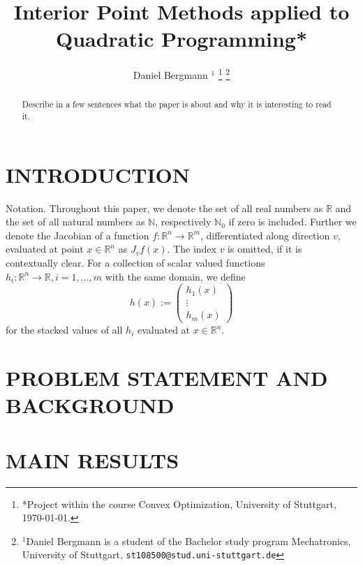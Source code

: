 \documentclass[a4paper, 10pt, conference]{ieeeconf}      %
\title{\LARGE \bf Interior Point Methods applied to Quadratic Programming*}
\author{Daniel Bergmann $^{1}$%
\thanks{*Project within the course Convex Optimization, University of Stuttgart, \today.}%
\thanks{$^{1}$Daniel Bergmann is a student of the Bachelor study program Mechatronics, University of Stuttgart,
        {\tt\small st108500@stud.uni-stuttgart.de}}%
}
\newcommand{\N}{\mathbb{N}}
\newcommand{\R}{\mathbb{R}}
\newcommand{\Rn}{\mathbb{R}^n}
\newcommand{\Rm}{\mathbb{R}^m}
\newcommand{\jac}{J}
\newcommand{\vectorthree}[3]{\begin{pmatrix}
		{#1} \\ {#2} \\ {#3}
\end{pmatrix}}
\begin{document}
\maketitle
\thispagestyle{empty}
\pagestyle{empty}


\begin{abstract}

Describe in a few sentences what the paper is about and why it is interesting 
to read it.

\end{abstract}


\section{INTRODUCTION}
%
%
%
%

Notation. Throughout this paper, we denote the set of all real numbers as $ \R $ and the set of all natural numbers as $ \N $, respectively $ \N_0  $ if zero is included. Further we denote the Jacobian of a function $ f: \Rn \longrightarrow \Rm $, differentiated along direction $ v $, evaluated at point $ x\in  \Rn $ as $ \jac_v f(x) $. The index $ v $ is omitted, if it is contextually clear. For a collection of scalar valued functions $ h_i: \Rn \longrightarrow \R, i = 1,\dots,m $ with the same domain, we define \[ h(x) := \vectorthree{h_1(x)}{\vdots}{h_m(x)} \] for the stacked values of all $ h_i $ evaluated at $ x \in \Rn $.

\section{PROBLEM STATEMENT AND BACKGROUND}


\section{MAIN RESULTS}

\end{document}

